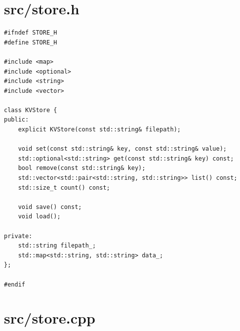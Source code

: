 \documentclass[11pt,a4paper]{book}
\newcommand{\file}[1]{\texttt{#1}}
\begin{document}
\section{src/store.h}

\begin{lstlisting}[style=cpp,title={\file{src/store.h}}]
#ifndef STORE_H
#define STORE_H

#include <map>
#include <optional>
#include <string>
#include <vector>

class KVStore {
public:
    explicit KVStore(const std::string& filepath);

    void set(const std::string& key, const std::string& value);
    std::optional<std::string> get(const std::string& key) const;
    bool remove(const std::string& key);
    std::vector<std::pair<std::string, std::string>> list() const;
    std::size_t count() const;

    void save() const;
    void load();

private:
    std::string filepath_;
    std::map<std::string, std::string> data_;
};

#endif
\end{lstlisting}

\section{src/store.cpp}
\end{document}
